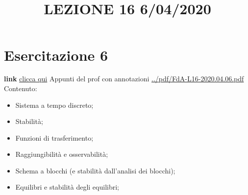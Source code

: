 \section{Esercitazione 6}
\title{LEZIONE 16 6/04/2020}\newline
\textbf{link} \href{https://web.microsoftstream.com/video/0384d9d2-5ddc-4381-8933-f46dc8fca4d3?list=user&userId=faa91214-a6f5-40d7-8875-253fd49b8ce1}{clicca qui}\newline
\newline
Appunti del prof con annotazioni \url{../pdf/FdA-L16-2020.04.06.pdf}\newline
Contenuto:
\begin{itemize}
    \item Sistema a tempo discreto;
    \item Stabilità;
    \item Funzioni di trasferimento;
    \item Raggiungibilità e osservabilità;
    \item Schema a blocchi (e stabilità dall'analisi dei blocchi);
    \item Equilibri e stabilità degli equilibri;
\end{itemize}